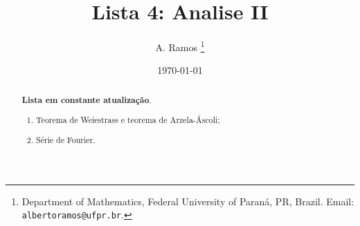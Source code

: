 \documentclass{article}
\begin{document}
\title{Lista 4: Analise II}

\author{
A. Ramos \thanks{Department of Mathematics,
    Federal University of Paraná, PR, Brazil.
    Email: {\tt albertoramos@ufpr.br}.}
}

\date{\today}
 
\maketitle

\begin{abstract}
{\bf Lista em constante atualização}.
 \begin{enumerate}
 \item Teorema de Weiestrass e teorema de Arzela-Áscoli; 
 \item Série de Fourier.
 \end{enumerate}
\end{abstract}
\end{document}
